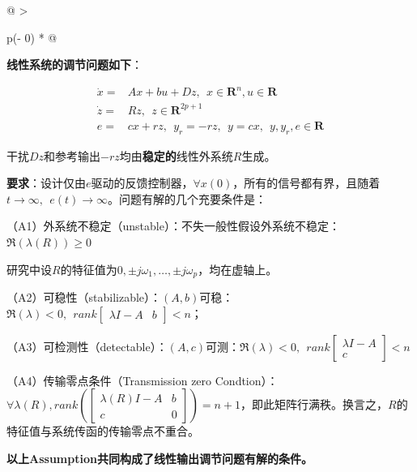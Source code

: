 \documentclass[
  12pt,
  a4paper
]{article}
\begin{document}
\begin{longtable}[]{@{}
  >{\raggedright\arraybackslash}p{}@{}}
\toprule\noalign{}
\begin{minipage}[b]{\linewidth}\raggedright
\textbf{线性系统的调节问题如下}：

\[\begin{aligned}
\dot{x} = & Ax + bu + Dz,\ \ x \in \mathbf{R}^{n},u \in \mathbf{R} \\
\dot{z} = & Rz,\ \ z \in \mathbf{R}^{2p + 1} \\
e = & {cx + rz,\ \ y}_{r} = - rz,\ \ y = cx,\ \ y,y_{r},e \in \mathbf{R}
\end{aligned}\]

干扰\(Dz\)和参考输出\(- rz\)均由\textbf{稳定的}线性外系统\(R\)生成。

\textbf{要求}：设计仅由\(e\)驱动的反馈控制器，\(\forall x(0)\)，所有的信号都有界，且随着\(t \rightarrow \infty,\ \ e(t) \rightarrow \infty\)。问题有解的几个充要条件是：

（A1）外系统不稳定（unstable）：不失一般性假设外系统不稳定：\(\mathfrak{R}\left( \lambda(R) \right) \geq 0\)

研究中设\(R\)的特征值为\(0, \pm j\omega_{1},\ldots, \pm j\omega_{p}\)，均在虚轴上。

（A2）可稳性（stabilizable）：\((A,b)\)可稳：\(\mathfrak{R}(\lambda) < 0,\ \ rank\begin{bmatrix}
\lambda I - A & b
\end{bmatrix} < n\)；

（A3）可检测性（detectable）：\((A,c)\)可测：\(\mathfrak{R}(\lambda) < 0,\ \ rank\begin{bmatrix}
\lambda I - A \\
c
\end{bmatrix} < n\)

（A4）传输零点条件（Transmission zero
Condtion）：\(\forall\lambda(R),rank\left( \begin{bmatrix}
\lambda(R)I - A & b \\
c & 0
\end{bmatrix} \right) = n + 1\)，即此矩阵行满秩。换言之，\(R\)的特征值与系统传函的传输零点不重合。

\textbf{以上Assumption共同构成了线性输出调节问题有解的条件。}
\end{minipage} \\
\midrule\noalign{}
\endhead
\bottomrule\noalign{}
\endlastfoot
\end{longtable}
\end{document}
